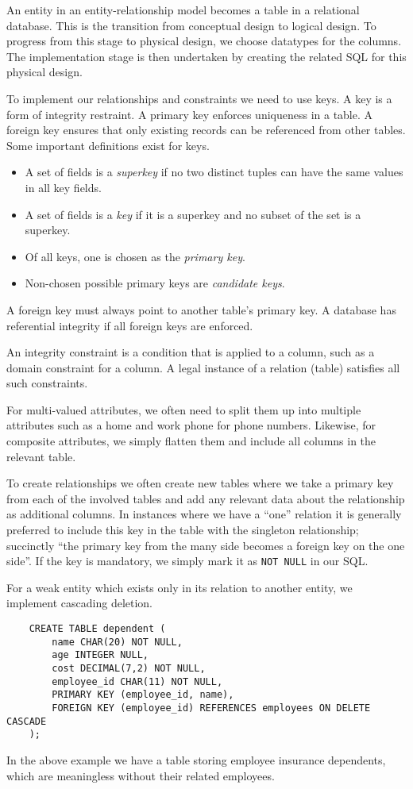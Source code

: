 \documentclass[12pt]{report}
\newcommand{\code}[1]{\lstinline{#1}}
\begin{document}
\begin{flushleft}
An entity in an entity-relationship model becomes a table in a relational
database. This is the transition from conceptual design to logical design. To
progress from this stage to physical design, we choose datatypes for the
columns. The implementation stage is then undertaken by creating the related
SQL for this physical design. \par
To implement our relationships and constraints we need to use keys. A key is a
form of integrity restraint. A primary key enforces uniqueness in a table. A
foreign key ensures that only existing records can be referenced from other
tables. Some important definitions exist for keys.
\begin{itemize}
    \item A set of fields is a \textit{superkey} if no two distinct tuples can
        have the same values in all key fields.
    \item A set of fields is a \textit{key} if it is a superkey and no subset of
        the set is a superkey.
    \item Of all keys, one is chosen as the \textit{primary key}.
    \item Non-chosen possible primary keys are \textit{candidate keys}.
\end{itemize}
A foreign key must always point to another table's primary key. A database has
referential integrity if all foreign keys are enforced. \par
An integrity constraint is a condition that is applied to a column, such as a
domain constraint for a column. A legal instance of a relation (table) satisfies
all such constraints. \par
For multi-valued attributes, we often need to split them
up into multiple attributes such as a home and work phone for phone numbers.
Likewise, for composite attributes, we simply flatten them and include all
columns in the relevant table. \par
To create relationships we often create new tables where we take a primary key
from each of the involved tables and add any relevant data about the
relationship as additional columns. In instances where we have a ``one''
relation it is generally preferred to include this key in the table with the
singleton relationship; succinctly ``the primary key from the many side becomes
a foreign key on the one side''. If the key is mandatory, we simply mark it as
\code{NOT NULL} in our SQL. \par
For a weak entity which exists only in its relation to another entity, we
implement cascading deletion.

\begin{lstlisting}
    CREATE TABLE dependent (
        name CHAR(20) NOT NULL,
        age INTEGER NULL,
        cost DECIMAL(7,2) NOT NULL,
        employee_id CHAR(11) NOT NULL,
        PRIMARY KEY (employee_id, name),
        FOREIGN KEY (employee_id) REFERENCES employees ON DELETE CASCADE
    );
\end{lstlisting}

In the above example we have a table storing employee insurance dependents,
which are meaningless without their related employees.

\end{flushleft}
\end{document}
